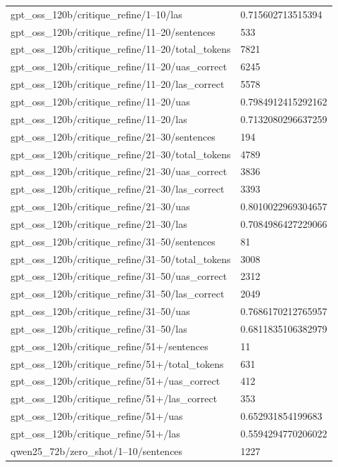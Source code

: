 \begin{tabular}{ll}
gpt\_oss\_120b/critique\_refine/1–10/las & 0.715602713515394 \\
gpt\_oss\_120b/critique\_refine/11–20/sentences & 533 \\
gpt\_oss\_120b/critique\_refine/11–20/total\_tokens & 7821 \\
gpt\_oss\_120b/critique\_refine/11–20/uas\_correct & 6245 \\
gpt\_oss\_120b/critique\_refine/11–20/las\_correct & 5578 \\
gpt\_oss\_120b/critique\_refine/11–20/uas & 0.7984912415292162 \\
gpt\_oss\_120b/critique\_refine/11–20/las & 0.7132080296637259 \\
gpt\_oss\_120b/critique\_refine/21–30/sentences & 194 \\
gpt\_oss\_120b/critique\_refine/21–30/total\_tokens & 4789 \\
gpt\_oss\_120b/critique\_refine/21–30/uas\_correct & 3836 \\
gpt\_oss\_120b/critique\_refine/21–30/las\_correct & 3393 \\
gpt\_oss\_120b/critique\_refine/21–30/uas & 0.8010022969304657 \\
gpt\_oss\_120b/critique\_refine/21–30/las & 0.7084986427229066 \\
gpt\_oss\_120b/critique\_refine/31–50/sentences & 81 \\
gpt\_oss\_120b/critique\_refine/31–50/total\_tokens & 3008 \\
gpt\_oss\_120b/critique\_refine/31–50/uas\_correct & 2312 \\
gpt\_oss\_120b/critique\_refine/31–50/las\_correct & 2049 \\
gpt\_oss\_120b/critique\_refine/31–50/uas & 0.7686170212765957 \\
gpt\_oss\_120b/critique\_refine/31–50/las & 0.6811835106382979 \\
gpt\_oss\_120b/critique\_refine/51+/sentences & 11 \\
gpt\_oss\_120b/critique\_refine/51+/total\_tokens & 631 \\
gpt\_oss\_120b/critique\_refine/51+/uas\_correct & 412 \\
gpt\_oss\_120b/critique\_refine/51+/las\_correct & 353 \\
gpt\_oss\_120b/critique\_refine/51+/uas & 0.652931854199683 \\
gpt\_oss\_120b/critique\_refine/51+/las & 0.5594294770206022 \\
qwen25\_72b/zero\_shot/1–10/sentences & 1227 \\

\end{tabular}
